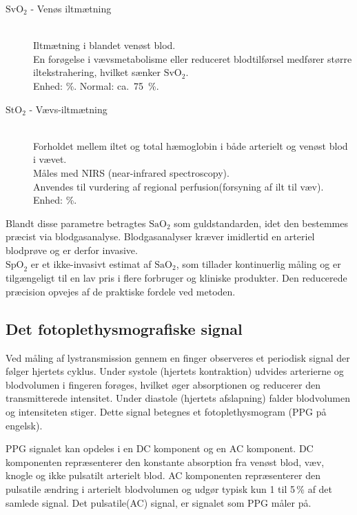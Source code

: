 \begin{description}
    \item[$\text{SvO}_2$ - Venøs iltmætning] \hfill
    \\
    Iltmætning i blandet venøst blod. \\ 
    En forøgelse i vævsmetabolisme eller reduceret blodtilførsel medfører større iltekstrahering, hvilket sænker $\text{SvO}_2$. \\
    Enhed: \%. Normal: ca.\ \SI{75}{\percent}.

    \item[$\text{StO}_2$ - Vævs-iltmætning] \hfill
    \\
    Forholdet mellem iltet og total hæmoglobin i både arterielt og venøst blod i vævet. \\
    Måles med NIRS (near-infrared spectroscopy). \\
    Anvendes til vurdering af regional perfusion(forsyning af ilt til væv). \\
    Enhed: \%.
\end{description}

Blandt disse parametre betragtes $\text{SaO}_2$ som guldstandarden, idet den bestemmes præcist via blodgasanalyse. Blodgasanalyser kræver imidlertid en arteriel blodprøve og er derfor invasive. \\ 
$\text{SpO}_2$ er et ikke-invasivt estimat af $\text{SaO}_2$, som tillader kontinuerlig måling og er tilgængeligt til en lav pris i flere forbruger og kliniske produkter. Den reducerede præcision opvejes af de praktiske fordele ved metoden.



\subsection{Det fotoplethysmografiske signal}
Ved måling af lystransmission gennem en finger observeres et periodisk signal der følger hjertets cyklus. Under systole (hjertets kontraktion) udvides arterierne og blodvolumen i fingeren forøges, hvilket øger absorptionen og reducerer den transmitterede intensitet. Under diastole (hjertets afslapning) falder blodvolumen og intensiteten stiger. Dette signal betegnes et fotoplethysmogram (PPG på engelsk).

PPG signalet kan opdeles i en DC komponent og en AC komponent. DC komponenten repræsenterer den konstante absorption fra venøst blod, væv, knogle og ikke pulsatilt arterielt blod. AC komponenten repræsenterer den pulsatile ændring i arterielt blodvolumen og udgør typisk kun 1 til 5\,\% af det samlede signal. Det pulsatile(AC) signal, er signalet som PPG måler på.


